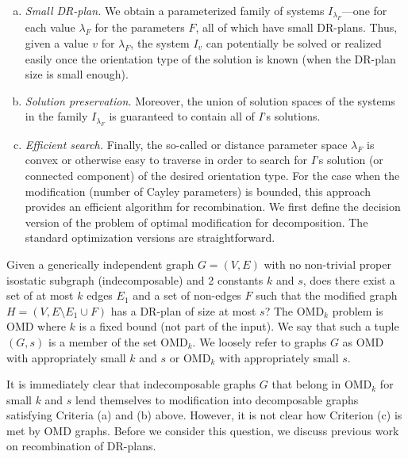 \begin{enumerate}[(a)]
    \item
    {\sl Small DR-plan.}
    We obtain a  parameterized family of systems $I_{\lambda_F}$---one for each value $\lambda_F$ for the parameters $F$,  all of which have small DR-plans. Thus, given a value $v$ for $\lambda_F$, the system $I_v$ can potentially be solved or realized easily once the orientation type of the solution is known  (when the DR-plan size is small enough).


    \item
    {\sl Solution preservation.}
    Moreover, the union of solution spaces of the systems in the family $I_{\lambda_F}$ is guaranteed to contain all of $I$'s solutions.


    \item
    {\sl Efficient search.}
    Finally,  the so-called  or distance parameter space $\lambda_F$  is convex or otherwise easy to traverse in order to search for $I$'s solution (or connected component) of the desired orientation type. For the case when the modification (number of Cayley parameters) is bounded, this approach provides an efficient algorithm for recombination. We first define the decision version of the problem of optimal modification for decomposition. The standard optimization versions are straightforward.
\end{enumerate}



Given a generically independent graph $G = (V,E)$ with no non-trivial proper isostatic subgraph (indecomposable) and 2 constants $k$ and $s$, does there exist a set of at most $k$  edges $E_1$ and a set of non-edges $F$ such that the modified graph $H = (V, E\setminus E_1 \cup F)$ has a DR-plan of size at most $s$?  The OMD$_k$ problem is  OMD where $k$ is a fixed bound (not part of the input). We say that such a tuple $(G,s)$ is a member of the set OMD$_k$. We loosely refer to graphs $G$ as OMD with appropriately small $k$ and $s$ or OMD$_k$ with appropriately small $s$.


It is immediately clear that indecomposable graphs $G$ that belong in OMD$_k$ for small $k$ and $s$  lend themselves to modification  into decomposable graphs satisfying Criteria (a) and (b) above. However, it is not clear how Criterion (c) is met by OMD graphs. Before we consider this question, we discuss previous work on recombination of DR-plans.





